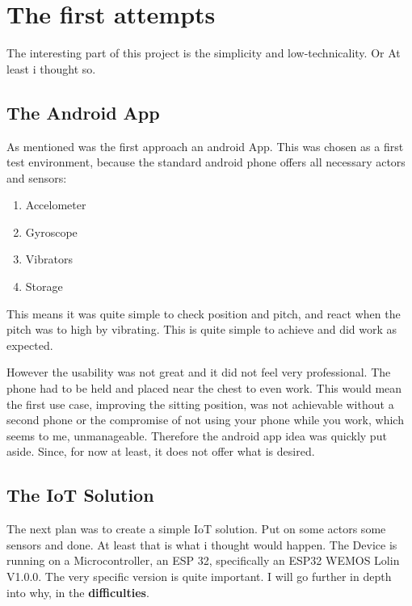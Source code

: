 \chapter*{The first attempts}
\label{chap:Technical Basics}
\renewcommand{\thesection}{\arabic{section}}
\setcounter{section}{0}

The interesting part of this project is the simplicity and low-technicality. Or At least i thought so.

\section{The Android App}

As mentioned was the first approach an android App. This was chosen as a first test environment, because the standard android phone offers all necessary actors and sensors: 
\begin{enumerate}
    \item Accelometer
    \item Gyroscope
    \item Vibrators
    \item Storage
\end{enumerate}

This means it was quite simple to check position and pitch, and react when the pitch was to high by vibrating. This is quite simple to achieve and did work as expected.

However the usability was not great and it did not feel very professional. The phone had to be held and placed near the chest to even work. This would mean the first use case, improving the sitting position, was not achievable without a second phone or the compromise of not using your phone while you work, which seems to me, unmanageable. Therefore the android app idea was quickly put aside. Since, for now at least, it does not offer what is desired.

\newpage
\section{The IoT Solution}

The next plan was to create a simple IoT solution. Put on some actors some sensors and done. At least that is what i thought would happen. The Device is running on a Microcontroller, an ESP 32, specifically an ESP32 WEMOS Lolin V1.0.0. The very specific version is quite important. I will go further in depth into why, in the \textbf{difficulties}.

